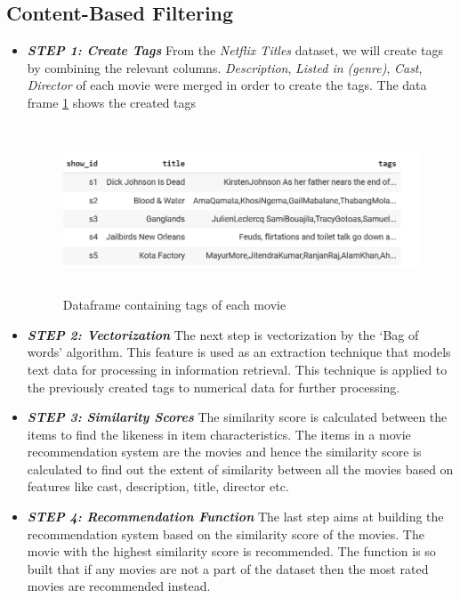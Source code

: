 \documentclass[a4paper,10pt]{article}
\begin{document}
\subsection{Content-Based Filtering}
\begin{itemize}
    \item  \textbf{\textit{STEP 1: Create Tags}} 
    From the \textit{Netflix Titles} dataset, we will  create tags by combining the relevant columns. \textit{Description}, \textit{Listed in (genre)}, \textit{Cast}, \textit{Director} of each movie were merged in order to create the tags. The data frame \ref{tags} shows the created tags


\begin{figure}[ht]
        
        \centering
        \includegraphics[height=5cm]{figures/tags.png}
        \caption{Dataframe containing tags of each movie}
        \label{tags}
\end{figure}

    \item  \textbf{\textit{STEP 2: Vectorization}}
    The next step is vectorization by the ‘Bag of words’ algorithm. This feature is used as an extraction technique that models text data for processing in information retrieval. This technique is applied to the previously created tags to numerical data for further processing.

    \item  \textbf{\textit{STEP 3: Similarity Scores}}
    The similarity score is calculated between the items to find the likeness in item characteristics. The items in a movie recommendation system are the movies and hence the similarity score is calculated to find out the extent of similarity between all the movies based on features like cast, description, title, director etc.

    \item  \textbf{\textit{STEP 4: Recommendation Function}}
    The last step aims at building the recommendation system based on the similarity score of the movies. The movie with the highest similarity score is recommended. The function is so built that if any movies are not a part of the dataset then the most rated movies are recommended instead.


\end{itemize}
\end{document}
